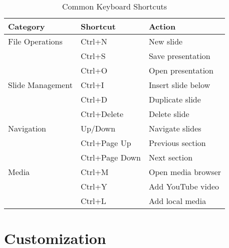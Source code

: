 \documentclass[11pt,a4paper]{article}
\begin{document}
\begin{table}[H]
\centering
\begin{tabular}{|l|l|l|}
    \hline
    \textbf{Category} & \textbf{Shortcut} & \textbf{Action} \\
    \hline
    File Operations & Ctrl+N & New slide \\
                   & Ctrl+S & Save presentation \\
                   & Ctrl+O & Open presentation \\
    \hline
    Slide Management & Ctrl+I & Insert slide below \\
                    & Ctrl+D & Duplicate slide \\
                    & Ctrl+Delete & Delete slide \\
    \hline
    Navigation & Up/Down & Navigate slides \\
               & Ctrl+Page Up & Previous section \\
               & Ctrl+Page Down & Next section \\
    \hline
    Media & Ctrl+M & Open media browser \\
          & Ctrl+Y & Add YouTube video \\
          & Ctrl+L & Add local media \\
    \hline
\end{tabular}
\caption{Common Keyboard Shortcuts}
\end{table}

\section{Customization}
\end{document}
